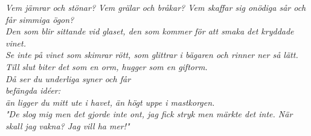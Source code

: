 \documentclass[a6paper, 10pt, twoside]{article}
\begin{document}
\noindent
{}
\newline
\large\textit{\indent Vem jämrar och stönar? Vem grälar och bråkar? Vem skaffar sig onödiga sår och får simmiga ögon? \\
\indent Den som blir sittande vid glaset, den som kommer för att smaka det kryddade vinet. \\
\indent Se inte på vinet som skimrar rött, som glittrar i bägaren
och rinner ner så lätt.\\
\indent Till slut biter det som en orm,
hugger som en giftorm. \\
\indent Då ser du underliga syner och får \\befängda idéer:\\
\indent än ligger du mitt ute i havet, än högt uppe i mastkorgen.\\
\indent "De slog mig men det gjorde inte ont,
jag fick stryk men märkte det inte.
När skall jag vakna?
Jag vill ha mer!"}
\end{document}
